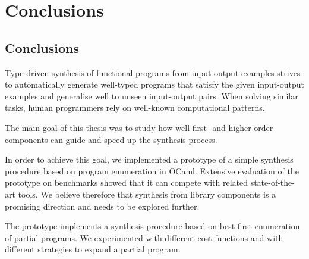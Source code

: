 \chapter{Conclusions} \label{ch:conclusions}

\section{Conclusions}

Type-driven synthesis of functional programs from input-output examples   strives to automatically generate well-typed programs that satisfy the given input-output examples and generalise well to unseen input-output pairs. When solving similar tasks, human programmers rely on well-known computational patterns.


The main goal of this thesis was to study how well first- and higher-order components can guide and speed up the synthesis process.

In order to achieve this goal, we implemented a prototype of a simple synthesis procedure based on program enumeration in OCaml. Extensive evaluation of the prototype on benchmarks showed that it can compete with related state-of-the-art tools. We believe therefore that synthesis from library components is a promising direction and needs to be explored further.

The prototype implements a synthesis procedure based on best-first enumeration of partial programs. We experimented with different cost functions and with different strategies to expand a partial program.

